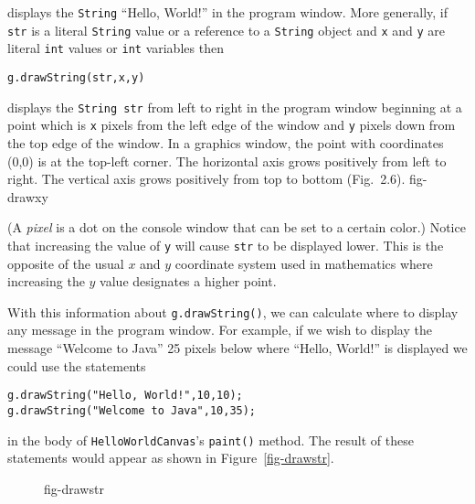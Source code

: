 \noindent displays the {\tt String} ``Hello, World!'' in the program window.  More
generally, if {\tt str} is a literal {\tt String} value or a reference
to a {\tt String} object and {\tt x} and {\tt y} are literal {\tt int}
values or {\tt int} variables then

\begin{jjjlisting}
\begin{lstlisting}  
g.drawString(str,x,y) 
\end{lstlisting}
\end{jjjlisting}

\noindent displays the {\tt String str} from left to right in the program window
beginning at a point which is {\tt x} pixels from the left edge of the
window and {\tt y} pixels down from the top edge of the window. In a
graphics window, the point with coordinates (0,0) is at the top-left
corner. The horizontal axis grows positively from left to right. The
vertical axis grows positively from top to bottom (Fig.~2.6). 
{fig-drawxy}

(A {\em pixel} is a dot on the console window that can be set to a
certain color.)  Notice that increasing the value of {\tt y} will
cause {\tt str} to be displayed lower. This is the opposite of the
usual $x$ and $y$ coordinate system used in mathematics where
increasing the $y$ value designates a higher point.  

With this information about {\tt g.drawString()}, we can calculate
where to display any message in the program window.  For example, if we
wish to display the message ``Welcome to Java'' 25 pixels below where
``Hello, World!'' is displayed we could use the statements

\begin{jjjlisting}
\begin{lstlisting}
g.drawString("Hello, World!",10,10);
g.drawString("Welcome to Java",10,35);
\end{lstlisting}
\end{jjjlisting}

\noindent in the body of {\tt HelloWorldCanvas}'s {\tt paint()} method.  
The result of these statements would appear as shown in
Figure~\ref{fig-drawstr}.

\begin{figure}[h]
\figascaled{chptr02/drawstr.png}{0.75}{``Hello, World!'' is drawn
at coordinate (10, 10) and ``Welcome to Java'' at
(10, 35) on the JFrame.}
{fig-drawstr}
\end{figure}

